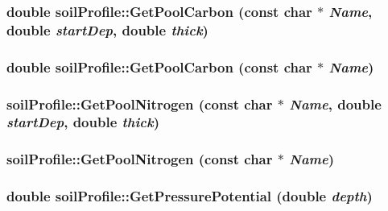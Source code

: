 \label{classsoil_profile_aee00c88c701f2ef848b9c96a3013e294}
\hypertarget{classsoil_profile_a46a43c1164e3fb8bbed604653f908561}{
\subsubsection[{GetPoolCarbon}]{\setlength{\rightskip}{0pt plus 5cm}double soilProfile::GetPoolCarbon (const char $\ast$ {\em Name}, \/  double {\em startDep}, \/  double {\em thick})}}
\label{classsoil_profile_a46a43c1164e3fb8bbed604653f908561}
\hypertarget{classsoil_profile_a268e490e7919d3e50abd2c25372f6c87}{
\subsubsection[{GetPoolCarbon}]{\setlength{\rightskip}{0pt plus 5cm}double soilProfile::GetPoolCarbon (const char $\ast$ {\em Name})}}
\label{classsoil_profile_a268e490e7919d3e50abd2c25372f6c87}
\hypertarget{classsoil_profile_a928dcc3f93130bf5bff194453a36d4f8}{
\subsubsection[{GetPoolNitrogen}]{ soilProfile::GetPoolNitrogen (const char $\ast$ {\em Name}, \/  double {\em startDep}, \/  double {\em thick})}}
\label{classsoil_profile_a928dcc3f93130bf5bff194453a36d4f8}
\hypertarget{classsoil_profile_a7cde7a4168ab9a8188fb4f6f18d79388}{
\subsubsection[{GetPoolNitrogen}]{ soilProfile::GetPoolNitrogen (const char $\ast$ {\em Name})}}
\label{classsoil_profile_a7cde7a4168ab9a8188fb4f6f18d79388}
\hypertarget{classsoil_profile_a2991385a93a7624c9aaa7bb395464943}{
\subsubsection[{GetPressurePotential}]{\setlength{\rightskip}{0pt plus 5cm}double soilProfile::GetPressurePotential (double {\em depth})}}
